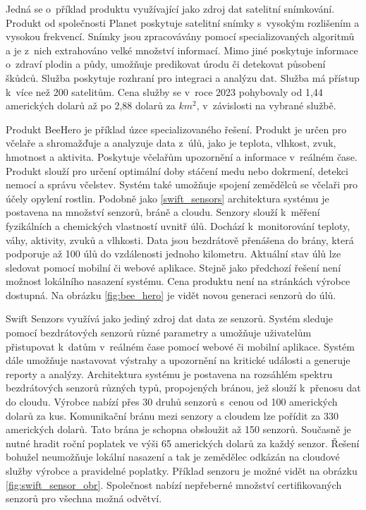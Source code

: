 Jedná se o~příklad produktu využívající jako zdroj dat satelitní snímkování. Produkt od společnosti Planet poskytuje satelitní snímky s~vysokým rozlišením a vysokou frekvencí. Snímky jsou zpracovávány pomocí specializovaných algoritmů a je z~nich extrahováno velké množství informací. Mimo jiné poskytuje informace o~zdraví plodin a půdy, umožňuje predikovat úrodu či detekovat působení škůdců. Služba poskytuje rozhraní pro integraci a analýzu dat. Služba má přístup k~více než 200 satelitům. Cena služby se v~roce 2023 pohybovaly od 1,44 amerických dolarů až po 2,88 dolarů za \begin{math}km^2\end{math}, v~závislosti na vybrané službě. \cite{PLANET}

Produkt BeeHero je příklad úzce specializovaného řešení. Produkt  je určen pro včelaře a shromažďuje a analyzuje data z~úlů, jako je teplota, vlhkost, zvuk, hmotnost a aktivita. Poskytuje včelařům upozornění a informace v~reálném čase. Produkt slouží pro určení optimální doby stáčení medu nebo dokrmení, detekci nemocí a správu včelstev. Systém také umožňuje spojení zemědělců se včelaři pro účely opylení rostlin. Podobně jako \ref{swift_sensors} architektura systému je postavena na množství senzorů, bráně a cloudu. Senzory slouží k~měření fyzikálních a chemických vlastností uvnitř úlů. Dochází k~monitorování teploty, váhy, aktivity, zvuků a vlhkosti. Data jsou bezdrátově přenášena do brány, která podporuje až 100 úlů do vzdálenosti jednoho kilometru. Aktuální stav úlů lze sledovat pomocí mobilní či webové aplikace. Stejně jako předchozí řešení není možnost lokálního nasazení systému. Cena produktu není na stránkách výrobce dostupná. Na obrázku \ref{fig:bee_hero} je vidět novou generaci senzorů do úlů. \cite{BEEHERO}

\label{swift_sensors}
Swift Senzors využívá jako jediný zdroj dat data ze senzorů. Systém sleduje pomocí bezdrátových senzorů různé parametry a umožňuje uživatelům přistupovat k~datům v~reálném čase pomocí webové či mobilní aplikace. Systém dále umožňuje nastavovat výstrahy a upozornění na kritické události a generuje reporty a analýzy. Architektura systému je postavena na rozsáhlém spektru bezdrátových senzorů různých typů, propojených bránou, jež slouží k~přenosu dat do cloudu. Výrobce nabízí přes 30 druhů senzorů s~cenou od 100 amerických dolarů za kus.  Komunikační bránu mezi senzory a cloudem lze pořídit za 330 amerických dolarů. Tato brána je schopna obsloužit až 150 senzorů. Současně je nutné hradit roční poplatek ve výši 65 amerických dolarů za každý senzor. Řešení bohužel neumožňuje lokální nasazení a tak je zemědělec odkázán na cloudové služby výrobce a pravidelné poplatky. Příklad senzoru je možné vidět na obrázku \ref{fig:swift_sensor_obr}. Společnost nabízí nepřeberné množství certifikovaných senzorů pro všechna možná odvětví. \cite{SWIFT}

